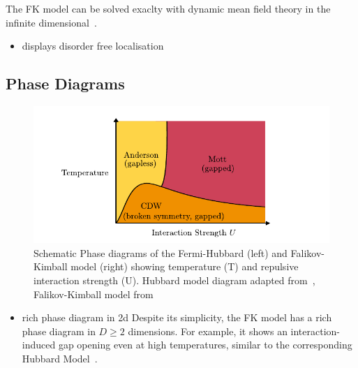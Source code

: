 The FK model can be solved exaclty with dynamic mean field theory in the infinite dimensional~\autocite{antipovCriticalExponentsStrongly2014,ribicNonlocalCorrelationsSpectral2016,freericksExactDynamicalMeanfield2003,herrmannNonequilibriumDynamicalCluster2016}.

\begin{itemize}
\tightlist
\item
  displays disorder free localisation
\end{itemize}

\hypertarget{phase-diagrams}{%
\subsection{Phase Diagrams}\label{phase-diagrams}}

\hypertarget{fig:fk_phase_diagram}{%
\begin{figure}
\centering
\includegraphics[width=1\textwidth,height=\textheight]{figure_code/background_chapter/fk_phase_diagram}
\caption[{Fermi-Hubbard and Falikov-Kimball Temperatue-Interaction Phase Diagrams}]{Schematic Phase diagrams of the Fermi-Hubbard (left) and Falikov-Kimball model (right) showing temperature (T) and repulsive interaction strength (U). Hubbard model diagram adapted from~\autocite{micnasSuperconductivityNarrowbandSystems1990}, Falikov-Kimball model from \autocite{antipovInteractionTunedAndersonMott2016,antipovCriticalExponentsStrongly2014a}}
\label{fig:fk_phase_diagram}
\end{figure}
}

\begin{itemize}
\tightlist
\item
  rich phase diagram in 2d Despite its simplicity, the FK model has a rich phase diagram in \(D \geq 2\) dimensions. For example, it shows an interaction-induced gap opening even at high temperatures, similar to the corresponding Hubbard Model~\autocite{brandtThermodynamicsCorrelationFunctions1989}.
\end{itemize}


